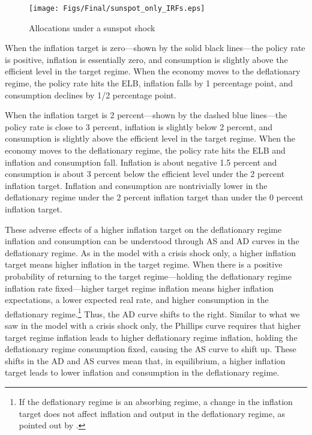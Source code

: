 \documentclass[11pt]{article}
\begin{document}
	\begin{figure}[!h]
		\begin{center}
			\caption{Allocations under a sunspot shock\label{fig:IRFs_Deflationary}}
			\texttt{[image: Figs/Final/sunspot\_only\_IRFs.eps]}\\
		\end{center}
	\end{figure}
	
	When the inflation target is zero---shown by the solid black lines---the policy rate is positive, inflation is essentially zero, and consumption is slightly above the efficient level in the target regime. When the economy moves to the deflationary regime, the policy rate hits the ELB, inflation falls by 1 percentage point, and consumption declines by 1/2 percentage point. 
	
	When the inflation target is 2 percent---shown by the dashed blue lines---the policy rate is close to 3 percent, inflation is slightly below 2 percent, and consumption is slightly above the efficient level in the target regime. When the economy moves to the deflationary regime, the policy rate hits the ELB and inflation and consumption fall. Inflation is about negative 1.5 percent and consumption is about 3 percent below the efficient level under the 2 percent inflation target. Inflation and consumption are nontrivially lower in the deflationary regime under the 2 percent inflation target than under the 0 percent inflation target. 
	
	These adverse effects of a higher inflation target on the deflationary regime inflation and consumption can be understood through AS and AD curves in the deflationary regime. As in the model with a crisis shock only, a higher inflation target means higher inflation in the target regime. When there is a positive probability of returning to the target regime---holding the deflationary regime inflation rate fixed---higher target regime inflation means higher inflation expectations, a lower expected real rate, and higher consumption in the deflationary regime.\footnote{If the deflationary regime is an absorbing regime, a change in the inflation target does not affect inflation and output in the deflationary regime, as pointed out by \citet{CubaBordaSingh2018}.} Thus, the AD curve shifts to the right. Similar to what we saw in the model with a crisis shock only, the Phillips curve requires that higher target regime inflation leads to higher deflationary regime inflation, holding the deflationary regime consumption fixed, causing the AS curve to shift up. These shifts in the AD and AS curves mean that, in equilibrium, a higher inflation target leads to lower inflation and consumption in the deflationary regime.
	
\end{document}
